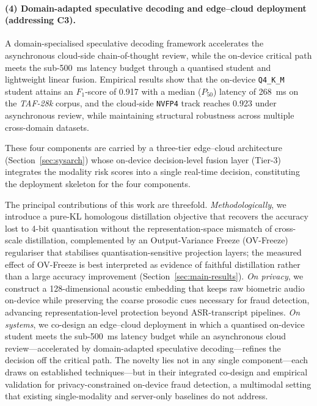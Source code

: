 \documentclass[a4paper,fleqn]{cas-sc}
\begin{document}
\paragraph{(4) Domain-adapted speculative decoding and edge--cloud deployment (addressing C3).}
A domain-specialised speculative decoding framework accelerates the asynchronous cloud-side chain-of-thought review, while the on-device critical path meets the sub-500~ms latency budget through a quantised student and lightweight linear fusion. Empirical results show that the on-device \texttt{Q4\_K\_M} student attains an $F_1$-score of 0.917 with a median ($P_{50}$) latency of 268~ms on the \textit{TAF-28k} corpus, and the cloud-side \texttt{NVFP4} track reaches 0.923 under asynchronous review, while maintaining structural robustness across multiple cross-domain datasets.

These four components are carried by a three-tier edge--cloud architecture (Section~\ref{sec:sysarch}) whose on-device decision-level fusion layer (Tier-3) integrates the modality risk scores into a single real-time decision, constituting the deployment skeleton for the four components.

The principal contributions of this work are threefold. \textit{Methodologically}, we introduce a pure-KL homologous distillation objective that recovers the accuracy lost to 4-bit quantisation without the representation-space mismatch of cross-scale distillation, complemented by an Output-Variance Freeze (OV-Freeze) regulariser that stabilises quantisation-sensitive projection layers; the measured effect of OV-Freeze is best interpreted as evidence of faithful distillation rather than a large accuracy improvement (Section~\ref{sec:main-results}). \textit{On privacy}, we construct a 128-dimensional acoustic embedding that keeps raw biometric audio on-device while preserving the coarse prosodic cues necessary for fraud detection, advancing representation-level protection beyond ASR-transcript pipelines. \textit{On systems}, we co-design an edge--cloud deployment in which a quantised on-device student meets the sub-500~ms latency budget while an asynchronous cloud review---accelerated by domain-adapted speculative decoding---refines the decision off the critical path. The novelty lies not in any single component---each draws on established techniques---but in their integrated co-design and empirical validation for privacy-constrained on-device fraud detection, a multimodal setting that existing single-modality and server-only baselines do not address.
\end{document}
